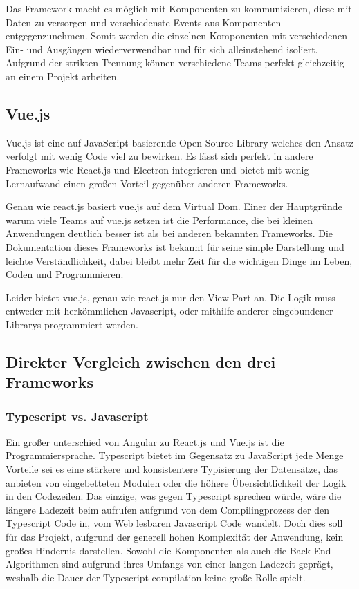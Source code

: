 Das Framework macht es möglich mit Komponenten zu kommunizieren, diese mit Daten zu versorgen und verschiedenste Events aus Komponenten entgegenzunehmen. Somit werden die einzelnen Komponenten mit verschiedenen Ein- und Ausgängen wiederverwendbar und für sich alleinstehend isoliert. Aufgrund der strikten Trennung können verschiedene Teams perfekt gleichzeitig an einem Projekt arbeiten.
\subsection{Vue.js}
Vue.js\cite{VueJs} ist eine auf JavaScript basierende Open-Source Library welches den Ansatz verfolgt mit wenig
Code viel zu bewirken. Es lässt sich perfekt in andere Frameworks wie React.js und Electron
integrieren und bietet mit wenig Lernaufwand einen großen Vorteil gegenüber anderen Frameworks.

Genau wie react.js basiert vue.js auf dem Virtual Dom. Einer der Hauptgründe warum viele Teams
auf vue.js setzen ist die Performance, die bei kleinen Anwendungen deutlich besser ist als bei
anderen bekannten Frameworks. Die Dokumentation dieses Frameworks ist bekannt für seine simple
Darstellung und leichte Verständlichkeit, dabei bleibt mehr Zeit für die wichtigen Dinge im Leben,
Coden und Programmieren.

Leider bietet vue.js, genau wie react.js nur den View-Part an. Die Logik
muss entweder mit herkömmlichen Javascript, oder mithilfe anderer eingebundener Librarys
programmiert werden.
\subsection{Direkter Vergleich zwischen den drei Frameworks}
\subsubsection{Typescript vs. Javascript}
Ein großer unterschied von Angular zu React.js und Vue.js ist die Programmiersprache. Typescript bietet im Gegensatz zu JavaScript jede Menge Vorteile sei es eine stärkere und konsistentere Typisierung der Datensätze, das anbieten von eingebetteten Modulen oder die höhere Übersichtlichkeit der Logik in den Codezeilen. Das einzige, was gegen Typescript sprechen würde, wäre die längere Ladezeit beim aufrufen aufgrund von dem Compilingprozess der den Typescript Code in, vom Web lesbaren Javascript Code wandelt. Doch dies soll für das Projekt, aufgrund der generell hohen Komplexität der Anwendung, kein großes Hindernis darstellen. Sowohl die Komponenten als auch die Back-End Algorithmen sind aufgrund ihres Umfangs von einer langen Ladezeit geprägt, weshalb die Dauer der Typescript-compilation keine große Rolle spielt.
